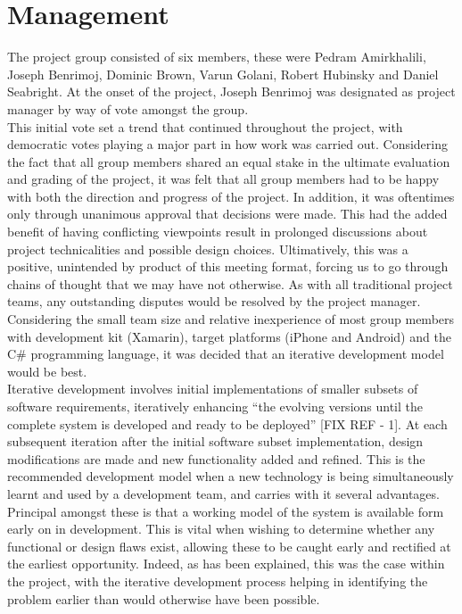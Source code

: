 \documentclass[main.tex]{subfiles}
\begin{document}
\section{Management}

The project group consisted of six members, these were Pedram Amirkhalili, Joseph Benrimoj, Dominic Brown, Varun Golani, Robert Hubinsky and Daniel Seabright. At the onset of the project, Joseph Benrimoj was designated as project manager by way of vote amongst the group.\\

This initial vote set a trend that continued throughout the project, with democratic votes playing a major part in how work was carried out. Considering the fact that all group members shared an equal stake in the ultimate evaluation and grading of the project, it was felt that all group members had to be happy with both the direction and progress of the project. In addition, it was oftentimes only through unanimous approval that decisions were made. This had the added benefit of having conflicting viewpoints result in prolonged discussions about project technicalities and possible design choices. Ultimatively, this was a positive, unintended by product of this meeting format, forcing us to go through chains of thought that we may have not otherwise. As with all traditional project teams, any outstanding disputes would be resolved by the project manager. \\

Considering the small team size and relative inexperience of most group members with development kit (Xamarin), target platforms (iPhone and Android) and the C\# programming language, it was decided that an iterative development model would be best.  \\

Iterative development involves initial implementations of smaller subsets of software requirements, iteratively enhancing ``the evolving versions until the complete system is developed and ready to be deployed'' [FIX REF - 1]. At each subsequent iteration after the initial software subset implementation, design modifications are made and new functionality added and refined. This is the recommended development model when a new technology is being simultaneously learnt and used by a development team, and carries with it several advantages.\\

Principal amongst these is that a working model of the system is available form early on in development. This is vital when wishing to determine whether any functional or design flaws exist, allowing these to be caught early and rectified at the earliest opportunity. Indeed, as has been explained, this was the case within the project, with the iterative development process helping in identifying the problem earlier than would otherwise have been possible.\\
\end{document}
